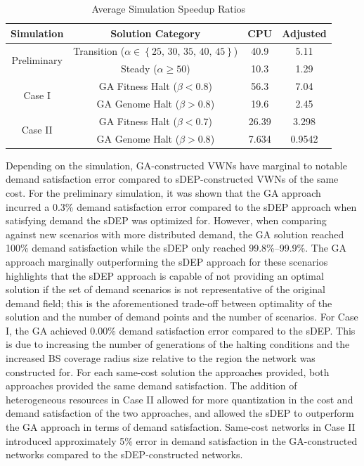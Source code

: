 \documentclass[12pt,dvipsnames]{report}
\begin{document}
\begin{table}[ht]
	\centering
	\caption{Average Simulation Speedup Ratios}
	\begin{tabular}{|c|c|c|c|} 
		\hline
		\textbf{Simulation} & \textbf{Solution Category} & \textbf{CPU} & \textbf{Adjusted} \\
		\hline
		\multirow{2}{*}{Preliminary} & Transition ($\alpha \in \left\{ 25,\, 30,\, 35,\, 40,\, 45 \right\}$) & 40.9 & 5.11 \\
		& Steady ($\alpha \geq 50$) & 10.3 & 1.29 \\
		\hline
		\multirow{2}{*}{Case I} & GA Fitness Halt ($\beta < 0.8$) & 56.3 & 7.04 \\
		& GA Genome Halt ($\beta > 0.8$) & 19.6 & 2.45 \\
		\hline
		\multirow{2}{*}{Case II} & GA Fitness Halt ($\beta < 0.7$) & 26.39 & 3.298 \\
		& GA Genome Halt ($\beta > 0.8$) & 7.634 & 0.9542 \\
		\hline
	\end{tabular}
	\label{tab:VWNConstructionRunTimes}
\end{table}

Depending on the simulation, GA-constructed VWNs have marginal to notable demand satisfaction error compared to sDEP-constructed VWNs of the same cost.  For the preliminary simulation, it was shown that the GA approach incurred a 0.3\% demand satisfaction error compared to the sDEP approach when satisfying demand the sDEP was optimized for.  However, when comparing against new scenarios with more distributed demand, the GA solution reached 100\% demand satisfaction while the sDEP only reached 99.8\%--99.9\%.  The GA approach marginally outperforming the sDEP approach for these scenarios highlights that the sDEP approach is capable of not providing an optimal solution if the set of demand scenarios is not representative of the original demand field; this is the aforementioned trade-off between optimality of the solution and the number of demand points and the number of scenarios.  For Case I, the GA achieved 0.00\% demand satisfaction error compared to the sDEP.  This is due to increasing the number of generations of the halting conditions and the increased BS coverage radius size relative to the region the network was constructed for.  For each same-cost solution the approaches provided, both approaches provided the same demand satisfaction.  The addition of heterogeneous resources in Case II allowed for more quantization in the cost and demand satisfaction of the two approaches, and allowed the sDEP to outperform the GA approach in terms of demand satisfaction.  Same-cost networks in Case II introduced approximately 5\% error in demand satisfaction in the GA-constructed networks compared to the sDEP-constructed networks.
\end{document}
